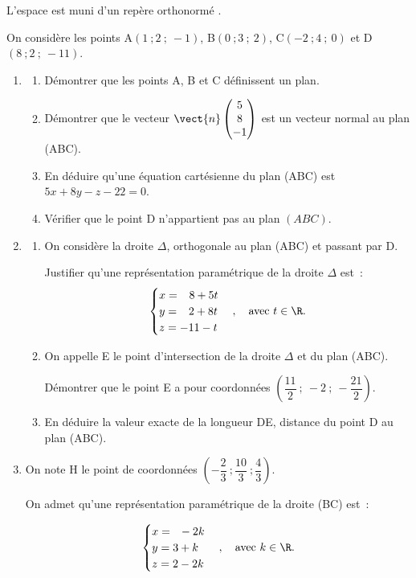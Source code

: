 L'espace est muni d'un repère orthonormé \Oij.

On considère les points A$(1~;2~;~-1)$, B$(0~;3~;~2)$, C$(-2~;4~;~0)$ et D$(8~;2~;~-11)$.

\begin{enumerate}
\item
\begin{enumerate}[label=\textbf{\alph*.}]
\item Démontrer que les points A, B et C définissent un plan.
\item Démontrer que le vecteur $\vect{n}\begin{pmatrix}5\\8\\-1\end{pmatrix}$ est un vecteur normal au plan (ABC).
\item En déduire qu'une équation cartésienne du plan (ABC) est $5x+ 8y - z - 22 = 0$.
\item Vérifier que le point D n'appartient pas au plan $(ABC)$.
\end{enumerate}

\item
	\begin{enumerate}[label=\textbf{\alph*.}]
		\item On considère la droite $\Delta$, orthogonale au plan (ABC) et passant par D.

Justifier qu'une représentation paramétrique de la droite $\Delta$ est~:
\[
\begin{cases}
x = \phantom{-}8+ 5t\\
y = \phantom{-}2+ 8t\\
z = -11- t
\end{cases}, \quad \text{avec } t \in \R.
\]
		\item On appelle E le point d'intersection de la droite $\Delta$ et du plan (ABC).

Démontrer que le point E a pour coordonnées $\left(\dfrac{11}{2}~;~-2~;~-\dfrac{21}{2}\right)$.
		\item En déduire la valeur exacte de la longueur DE, distance du point D au plan (ABC).
	\end{enumerate}
\item On note H le point de coordonnées $\left(-\dfrac{2}{3}~;\dfrac{10}{3}~;\dfrac{4}{3}\right)$.

On admet qu'une représentation paramétrique de la droite (BC) est~:

\[
\begin{cases}
x = \phantom{3}-2k\\
y = 3+k\\
z = 2-2k
\end{cases}, \quad \text{avec } k \in \R.
\]


\end{enumerate}
